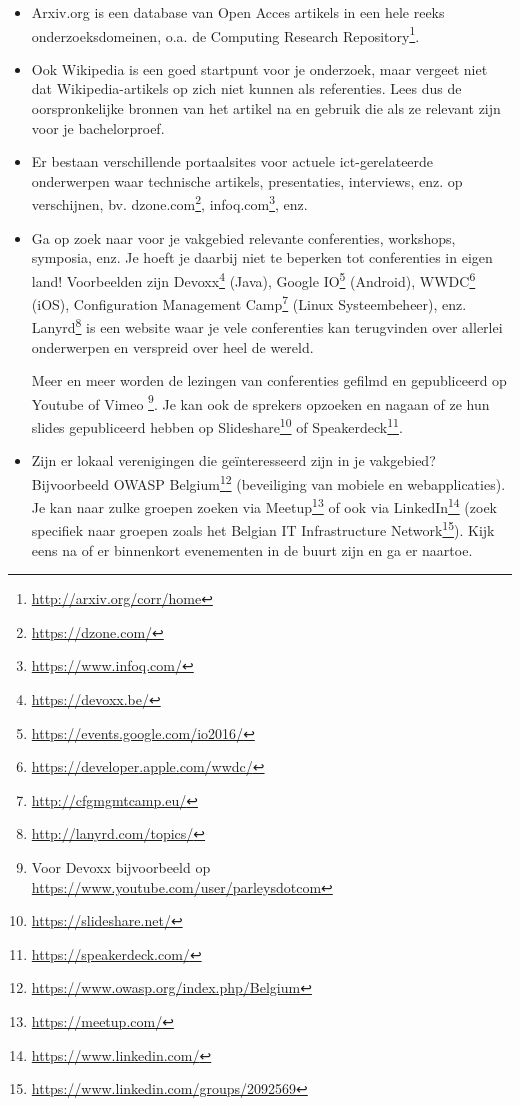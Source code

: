 \begin{itemize}
  \item Arxiv.org is een database van Open Acces artikels in een hele reeks onderzoeksdomeinen, o.a. de Computing Research Repository\footnote{\url{http://arxiv.org/corr/home}}.
  
  \item Ook Wikipedia is een goed startpunt voor je onderzoek, maar vergeet niet dat Wikipedia-artikels op zich niet kunnen als referenties. Lees dus de oorspronkelijke bronnen van het artikel na en gebruik die als ze relevant zijn voor je bachelorproef.
  
  \item Er bestaan verschillende portaalsites voor actuele ict-gerelateerde onderwerpen waar technische artikels, presentaties, interviews, enz. op verschijnen, bv. dzone.com\footnote{\url{https://dzone.com/}}, infoq.com\footnote{\url{https://www.infoq.com/}}, enz.
  
  \item Ga op zoek naar voor je vakgebied relevante conferenties, workshops, symposia, enz. Je hoeft je daarbij niet te beperken tot conferenties in eigen land! Voorbeelden zijn Devoxx\footnote{\url{https://devoxx.be/}} (Java), Google IO\footnote{\url{https://events.google.com/io2016/}} (Android), WWDC\footnote{\url{https://developer.apple.com/wwdc/}} (iOS), Configuration Management Camp\footnote{\url{http://cfgmgmtcamp.eu/}} (Linux Systeembeheer), enz. Lanyrd\footnote{\url{http://lanyrd.com/topics/}} is een website waar je vele conferenties kan terugvinden over allerlei onderwerpen en verspreid over heel de wereld.
  
  Meer en meer worden de lezingen van conferenties gefilmd en gepubliceerd op Youtube of Vimeo \footnote{Voor Devoxx bijvoorbeeld op \url{https://www.youtube.com/user/parleysdotcom}}. Je kan ook de sprekers opzoeken en nagaan of ze hun slides gepubliceerd hebben op Slideshare\footnote{\url{https://slideshare.net/}} of Speakerdeck\footnote{\url{https://speakerdeck.com/}}.
  
  \item Zijn er lokaal verenigingen die geïnteresseerd zijn in je vakgebied? Bijvoorbeeld OWASP Belgium\footnote{\url{https://www.owasp.org/index.php/Belgium}} (beveiliging van mobiele en webapplicaties). Je kan naar zulke groepen zoeken via Meetup\footnote{\url{https://meetup.com/}} of ook via LinkedIn\footnote{\url{https://www.linkedin.com/}} (zoek specifiek naar groepen zoals het Belgian IT Infrastructure Network\footnote{\url{https://www.linkedin.com/groups/2092569}}). Kijk eens na of er binnenkort evenementen in de buurt zijn en ga er naartoe.
  

\end{itemize}
